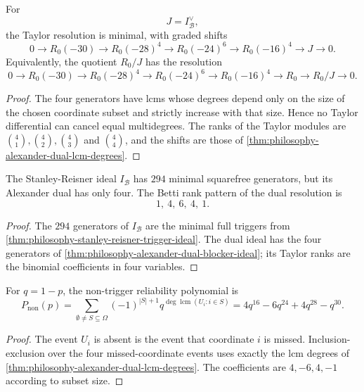 \begin{theorem}
\label{thm:philosophy-alexander-dual-minimal-taylor-resolution}
For
$$
  J=I_{\mathcal{B}}^{\vee},
$$
the Taylor resolution is minimal, with graded shifts
$$
  0
  \to
  R_{0}(-30)
  \to
  R_{0}(-28)^{4}
  \to
  R_{0}(-24)^{6}
  \to
  R_{0}(-16)^{4}
  \to
  J
  \to
  0.
$$
Equivalently, the quotient $R_{0}/J$ has the resolution
$$
  0
  \to
  R_{0}(-30)
  \to
  R_{0}(-28)^{4}
  \to
  R_{0}(-24)^{6}
  \to
  R_{0}(-16)^{4}
  \to
  R_{0}
  \to
  R_{0}/J
  \to
  0.
$$
\end{theorem}
\begin{proof}
The four generators have lcms whose degrees depend only on the size of
the chosen coordinate subset and strictly increase with that size.
Hence no Taylor differential can cancel equal multidegrees. The ranks
of the Taylor modules are $\binom{4}{1},\binom{4}{2},\binom{4}{3}$ and
$\binom{4}{4}$, and the shifts are those of
\autoref{thm:philosophy-alexander-dual-lcm-degrees}.
\end{proof}

\begin{corollary}
\label{cor:philosophy-dual-compression-trigger-hypergraph}
The Stanley-Reisner ideal $I_{\mathcal{B}}$ has $294$ minimal
squarefree generators, but its Alexander dual has only four. The Betti
rank pattern of the dual resolution is
$$
  1,\ 4,\ 6,\ 4,\ 1.
$$
\end{corollary}
\begin{proof}
The $294$ generators of $I_{\mathcal{B}}$ are the minimal full triggers
from \autoref{thm:philosophy-stanley-reisner-trigger-ideal}. The
dual ideal has the four generators of
\autoref{thm:philosophy-alexander-dual-blocker-ideal}; its Taylor ranks
are the binomial coefficients in four variables.
\end{proof}

\begin{theorem}
\label{thm:philosophy-reliability-from-lcm-lattice}
For $q=1-p$, the non-trigger reliability polynomial is
$$
  P_{\mathrm{non}}(p)
  =
  \sum_{\emptyset\neq S\subseteq\Omega}
  (-1)^{|S|+1}
  q^{\deg\operatorname{lcm}(U_{i}:i\in S)}
  =
  4q^{16}-6q^{24}+4q^{28}-q^{30}.
$$
\end{theorem}
\begin{proof}
The event $U_{i}$ is absent is the event that coordinate $i$ is missed.
Inclusion-exclusion over the four missed-coordinate events uses exactly
the lcm degrees of \autoref{thm:philosophy-alexander-dual-lcm-degrees}.
The coefficients are $4,-6,4,-1$ according to subset size.
\end{proof}


